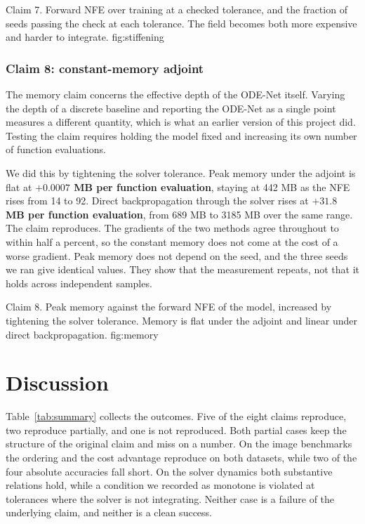   {Claim 7. Forward NFE over training at a checked tolerance, and the fraction of seeds passing
   the check at each tolerance. The field becomes both more expensive and harder to integrate.}
  {fig:stiffening}

\subsubsection{Claim 8: constant-memory adjoint}

The memory claim concerns the effective depth of the ODE-Net itself. Varying the depth of a
discrete baseline and reporting the ODE-Net as a single point measures a different quantity,
which is what an earlier version of this project did. Testing the claim requires holding the
model fixed and increasing its own number of function evaluations.

We did this by tightening the solver tolerance. Peak memory under the adjoint is flat at
\textbf{$+0.0007$ MB per function evaluation}, staying at 442 MB as the NFE rises from 14 to 92. Direct backpropagation through the solver rises at \textbf{$+31.8$ MB per function
evaluation}, from 689 MB to 3185 MB over the same range. The claim reproduces. The gradients of
the two methods agree throughout to within half a percent, so the constant memory does not come
at the cost of a worse gradient. Peak memory does not depend on the seed, and the three seeds we ran give identical values.
They show that the measurement repeats, not that it holds across independent samples.

  {Claim 8. Peak memory against the forward NFE of the model, increased by tightening the
   solver tolerance. Memory is flat under the adjoint and linear under direct
   backpropagation.}
  {fig:memory}

\section{Discussion}
\label{sec:discussion}

Table~\ref{tab:summary} collects the outcomes. Five of the eight claims reproduce, two reproduce
partially, and one is not reproduced. Both partial cases keep the structure of the original
claim and miss on a number. On the image benchmarks the ordering and the cost advantage
reproduce on both datasets, while two of the four absolute accuracies fall short. On the solver
dynamics both substantive relations hold, while a condition we recorded as monotone is violated
at tolerances where the solver is not integrating. Neither case is a failure of the underlying
claim, and neither is a clean success.

